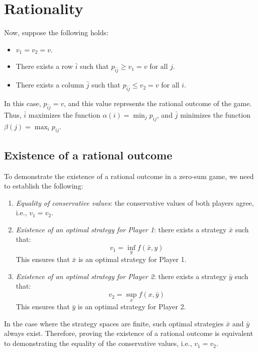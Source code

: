 \section{Rationality}

Now, suppose the following holds:
\begin{itemize}
    \item $v_1 = v_2 = v$.
    \item There exists a row $\bar{i}$ such that $p_{\bar{i}\bar{j}} \geq v_1 = v$ for all $j$.
    \item There exists a column $\bar{j}$ such that $p_{\bar{i}\bar{j}} \leq v_2 = v$ for all $i$.
\end{itemize}
In this case, $p_{\bar{i}\bar{j}} = v$, and this value represents the rational outcome of the game.
Thus, $\bar{i}$ maximizes the function $\alpha(i) = \min_j p_{ij}$, and $\bar{j}$ minimizes the function $\beta(j) = \max_i p_{ij}$.

\subsection{Existence of a rational outcome}
To demonstrate the existence of a rational outcome in a zero-sum game, we need to establish the following:
\begin{enumerate}
    \item \textit{Equality of conservative values}: the conservative values of both players agree, i.e., $v_1 = v_2$.
    \item \textit{Existence of an optimal strategy for Player 1}: there exists a strategy $\bar{x}$ such that:
        \[v_1 = \inf_y f (\bar{x}, y)\]
        This ensures that $\bar{x}$ is an optimal strategy for Player 1. 
    \item \textit{Existence of an optimal strategy for Player 2}: there exists a strategy $\bar{y}$ such that:
        \[v_2 = \sup_x f (x, \bar{y})\]
        This ensures that $\bar{y}$ is an optimal strategy for Player 2.
\end{enumerate}
In the case where the strategy spaces are finite, such optimal strategies $\bar{x}$ and $\bar{y}$ always exist. 
Therefore, proving the existence of a rational outcome is equivalent to demonstrating the equality of the conservative values, i.e., $v_1 = v_2$.

